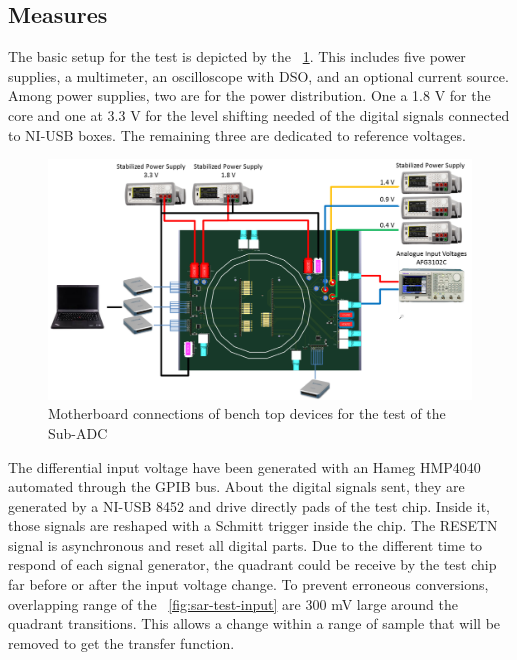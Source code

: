 \subsection{Measures}
The basic setup for the test is depicted by the \figurename~\ref{fig:sar-test-connections}. This includes five power supplies, a multimeter, an oscilloscope with DSO, and an optional current source. Among power supplies, two are for the power distribution. One a 1.8 V for the core and one at 3.3 V for the level shifting needed of the digital signals connected to NI-USB boxes. The remaining three are dedicated to reference voltages.

\begin{figure}[htp]
    \centering
    \includegraphics[width=.8\textwidth]{Chapter5/Figs/sar_test/board_test_setup.png}
    \caption{Motherboard connections of bench top devices for the test of the Sub-ADC}
    \label{fig:sar-test-connections}
\end{figure}

The differential input voltage have been generated with an Hameg HMP4040 automated through the GPIB bus. About the digital signals sent, they are generated by a NI-USB 8452 and drive directly pads of the test chip. Inside it, those signals are reshaped with a Schmitt trigger inside the chip. The RESETN signal is asynchronous and reset all digital parts. Due to the different time to respond of each signal generator, the quadrant could be receive by the test chip far before or after the input voltage change. To prevent erroneous conversions, overlapping range of the \figurename~\ref{fig:sar-test-input} are 300 mV large around the quadrant transitions. This allows a change within a range of sample that will be removed to get the transfer function.

